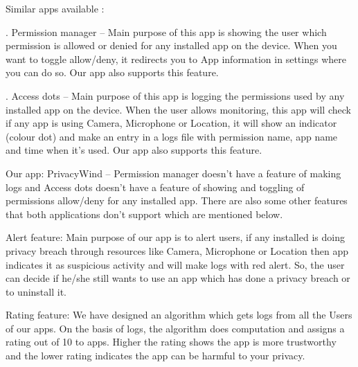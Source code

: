 \documentclass[12pt]{report}
\renewcommand{\_}{\kern-1.5pt\textunderscore\kern-1.5pt}
\begin{document}
\begin{multicols}{2}
\vspace{\baselineskip}
\setlength{\parskip}{12.0pt}
\begin{justify}
{\fontsize{10pt}{12.0pt}\selectfont Similar apps available :}
\end{justify}
\begin{justify}
{\fontsize{10pt}{12.0pt}. Permission manager – Main purpose of this app is showing the user which permission is allowed or denied for any installed app on the device. When you want to toggle allow/deny, it redirects you to App information in settings where you can do so. Our app also supports this feature.\par}
\end{justify}
\begin{justify}
{\fontsize{10pt}{12.0pt}. Access dots – Main purpose of this app is logging the permissions used by any installed app on the device. When the user allows monitoring, this app will check if any app is using Camera, Microphone or Location, it will show an indicator (colour dot) and make an entry in a logs file with permission name, app name and time when it’s used. Our app also supports this feature.\par}
\end{justify}
\begin{justify}
{\fontsize{10pt}{12.0pt}\selectfont Our app: PrivacyWind – Permission manager doesn’t have a feature of making logs and Access dots doesn’t have a feature of showing and toggling of permissions allow/deny for any installed app. There are also some other features that both applications don’t support which are mentioned below. \par}
\end{justify}
\begin{justify}
{\fontsize{10pt}{12.0pt}\selectfont Alert feature: Main purpose of our app is to alert users, if any installed is doing privacy breach through resources like Camera, Microphone or Location then app indicates it as suspicious activity and will make logs with red alert. So, the user can decide if he/she still wants to use an app which has done a privacy breach or to uninstall it.\par}
\end{justify}
\begin{justify}
{\fontsize{10pt}{12.0pt}\selectfont Rating feature: We have designed an algorithm which gets logs from all the Users of our apps. On the basis of logs, the algorithm does computation and assigns a rating out of 10 to apps. Higher the rating shows the app is more trustworthy and the lower rating indicates the app can be harmful to your privacy.\par}

\end{justify}
\end{multicols}
\end{document}
